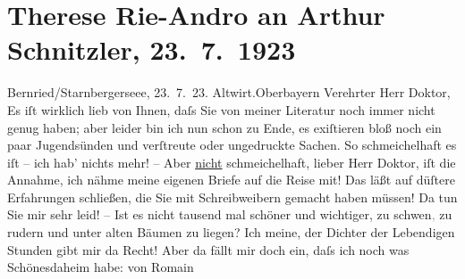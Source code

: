 

               \section[Therese Rie-Andro an Arthur Schnitzler, 23. 7. 1923]{ Therese Rie-Andro an Arthur Schnitzler, 23. 7. 1923}\nopagebreak{}\rehead{ }\begin{ledgroupsized}[t]{13cm}\normalsize\beginnumbering{} \toendnotes[C]{\smallbreak\pagebreak[2]} 
\toendnotes[C]{\smallbreak}\pstart
           \raggedleft{}{\pb}Bernried/Starnbergerseee,
                     23. 7. 23. \pend
           \pstart
           \raggedleft{}Altwirt.\hspace*{1.5em}Oberbayern\pend
           \pstart{}Verehrter Herr Doktor,\pend\pstart
           Es iſt wirklich lieb von Ihnen, daſs Sie von meiner Literatur noch immer nicht genug
               haben; aber leider bin ich nun schon zu Ende, es exiſtieren bloß noch ein paar
               Jugendsünden und verſtreute oder ungedruckte Sachen. So schmeichelhaft es iſt – ich
               hab’ nichts mehr! – Aber \uline{nicht} schmeichelhaft, lieber
               Herr Doktor, iſt die Annahme, ich nähme meine eigenen Briefe auf die Reise mit! Das
               läßt auf düſtere Erfahrungen schließen, die Sie mit Schreibweibern gemacht haben
               müssen! Da tun Sie mir sehr leid! – Ist es nicht tausend mal schöner und wichtiger,
               zu schw{\geminationm}en\textcolor{gray}{,} zu rudern und unter alten
               Bäumen zu liegen? Ich meine, der Dichter der Lebendigen
                  Stunden gibt mir da Recht!\pend
           \pstart
           Aber da fällt mir doch ein, daſs ich noch was Schönes\introOben{}daheim\introOben{} habe: von Romain

\end{ledgroupsized}
